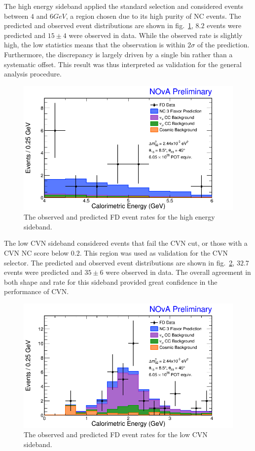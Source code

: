 The high energy sideband applied the standard selection and considered events between $4$ and $6\unit{GeV}$, a region chosen due to its high purity of NC events. The predicted and observed event distributions are shown in fig.~\ref{fig:SidebandHighE}, $8.2$ events were predicted and $15 \pm 4$ were observed in data. While the observed rate is slightly high, the low statistics means that the observation is within $2\sigma$ of the prediction. Furthermore, the discrepancy is largely driven by a single bin rather than a systematic offset. This result was thus interpreted as validation for the general analysis procedure.
\begin{figure}[!h]
  \centering
  \includegraphics[width=1\textwidth]{figures/Ana01Results/FDHighECalEDataMCStack.png}
  \caption[High Energy Sideband]{The observed and predicted FD event rates for the high energy sideband.}
  \label{fig:SidebandHighE}
\end{figure}

The low CVN sideband considered events that fail the CVN cut, or those with a CVN NC score below $0.2$. This region was used as validation for the CVN selector. The predicted and observed event distributions are shown in fig.~\ref{fig:SidebandLowCVN}, $32.7$ events were predicted and $35 \pm 6$ were observed in data. The overall agreement in both shape and rate for this sideband provided great confidence in the performance of CVN.
\begin{figure}[!h]
  \centering
  \includegraphics[width=1\textwidth]{figures/Ana01Results/FDLowCVNCalEDataMCStack.png}
  \caption[Low CVN Sideband]{The observed and predicted FD event rates for the low CVN sideband.}
  \label{fig:SidebandLowCVN}
\end{figure}

